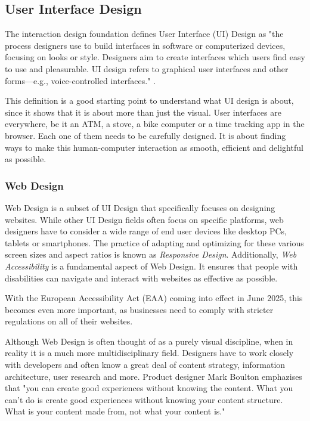 \newpage
\subsection{User Interface Design}
The interaction design foundation defines User Interface (UI) Design as "the process designers use
to build interfaces in software or computerized devices, focusing on looks or style. Designers aim
to create interfaces which users find easy to use and pleasurable. UI design refers to graphical
user interfaces and other forms—e.g., voice-controlled interfaces."
.

This definition is a good starting point to understand what UI design is about, since it
shows that it is about more than just the visual. User interfaces are everywhere, be it an ATM, a
stove, a bike computer or a time tracking app in the browser. Each one of them needs to be
carefully designed. It is about finding ways to make this human-computer interaction as smooth,
efficient and delightful as possible.

\subsubsection{Web Design}
Web Design is a subset of UI Design that specifically focuses on designing websites. While other UI
Design fields often focus on specific platforms, web designers have to consider a wide range of end
user devices like desktop PCs, tablets or smartphones. The practice of adapting and optimizing for
these various screen sizes and aspect ratios is known as \textit{Responsive Design}. Additionally,
\textit{Web Accessibility} is a fundamental aspect of Web Design. It ensures that people with
disabilities can navigate and interact with websites as effective as possible.

With the European Accessibility Act (EAA) coming into effect in June 2025, this becomes even more
important, as businesses need to comply with stricter regulations on all of their websites.

Although Web Design is often thought of as a purely visual discipline, when in reality it is a much
more multidisciplinary field. Designers have to work closely with developers and often know a great
deal of content strategy, information architecture, user research and more. Product designer Mark
Boulton emphazises that "you can create good experiences without knowing the content. What you can’t
do is create good experiences without knowing your content structure. What is your content made
from, not what your content is." 

